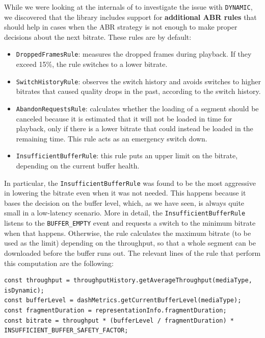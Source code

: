 While we were looking at the internals of \dashjs{} to investigate the issue with \texttt{DYNAMIC}, we discovered that the library includes support for \textbf{additional ABR rules} that should help in cases when the ABR strategy is not enough to make proper decisions about the next bitrate. These rules are by default:

\begin{itemize}
    \item \texttt{DroppedFramesRule}: measures the dropped frames during playback. If they exceed 15\%, the rule switches to a lower bitrate.
    \item \texttt{SwitchHistoryRule}: observes the switch history and avoids switches to higher bitrates that caused quality drops in the past, according to the switch history.
    \item \texttt{AbandonRequestsRule}: calculates whether the loading of a segment should be canceled because it is estimated that it will not be loaded in time for playback, only if there is a lower bitrate that could instead be loaded in the remaining time. This rule acts as an emergency switch down.
    \item \texttt{InsufficientBufferRule}: this rule puts an upper limit on the bitrate, depending on the current buffer health.
\end{itemize}

In particular, the \texttt{InsufficientBufferRule} was found to be the most aggressive in lowering the bitrate even when it was not needed. This happens because it bases the decision on the buffer level, which, as we have seen, is always quite small in a low-latency scenario. More in detail, the \texttt{InsufficientBufferRule} listens to the \texttt{BUFFER\_EMPTY} event and requests a switch to the minimum bitrate when that happens. Otherwise, the rule calculates the maximum bitrate (to be used as the limit) depending on the throughput, so that a whole segment can be downloaded before the buffer runs out. The relevant lines of the rule that perform this computation are the following:

\begin{verbatim}
const throughput = throughputHistory.getAverageThroughput(mediaType, isDynamic);
const bufferLevel = dashMetrics.getCurrentBufferLevel(mediaType);
const fragmentDuration = representationInfo.fragmentDuration;
const bitrate = throughput * (bufferLevel / fragmentDuration) * INSUFFICIENT_BUFFER_SAFETY_FACTOR;
\end{verbatim}

